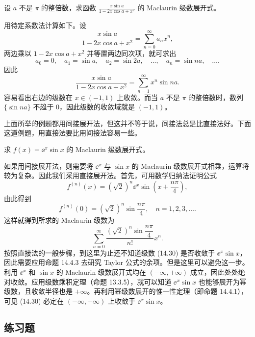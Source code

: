 \begin{xexample}[14.4.5]
设 $a$ 不是 $\pi$ 的整倍数，求函数 $\displaystyle\frac{x\sin a}{1-2x\cos a+x^2}$ 的 Maclaurin 级数展开式。
\end{xexample}
\begin{xsolution}
用待定系数法计算如下。设
\[
  \frac{x\sin a}{1-2x\cos a+x^2}=\sum_{n=0}^{\infty}a_nx^n,
\]
两边乘以 $1-2x\cos a+x^2$ 并等置两边同次项，就可求出
\[
  a_0=0,\quad a_1=\sin a,\quad a_2=\sin2a,\quad\ldots,\quad a_n=\sin na,\quad\ldots.
\]
因此
\[
  \frac{x\sin a}{1-2x\cos a+x^2}=\sum_{n=1}^{\infty}x^n\sin na.
\]
容易看出右边的级数在 $x\in(-1,1)$ 上收敛。而当 $a$ 不是 $\pi$ 的整倍数时，数列 $\{\sin na\}$ 不趋于 $0$，因此级数的收敛域就是 $(-1,1)$。
\end{xsolution}

上面所举的例题都用间接展开法，但这并不等于说，间接法总是比直接法好。下面这道例题，用直接法要比用间接法容易一些。

\begin{xexample}[14.4.6]
求 $f(x)=\ee^x\sin x$ 的 Maclaurin 级数展开式。
\end{xexample}
\begin{xsolution}
如果用间接展开法，则需要将 $\ee^x$ 与 $\sin x$ 的 Maclaurin 级数展开式相乘，运算将较为复杂。因此我们采用直接展开法。首先，可用数学归纳法证明公式
\[
  f^{(n)}(x)=(\sqrt2)^n\ee^x\sin\left(x+\frac{n\pi}{4}\right),
\]
由此得到
\[
  f^{(n)}(0)=(\sqrt2)^n\sin\frac{n\pi}{4},\quad n=1,2,3,\ldots.
\]
这样就得到所求的 Maclaurin 级数为
\begin{equation}
  \sum_{n=0}^{\infty}\frac{(\sqrt2)^n\sin\dfrac{n\pi}{4}}{n!}x^n.
  \tag{14.30}
  \label{eq:14.30}
\end{equation}
按照直接法的一般步骤，到这里为止还不知道级数 (14.30) 是否收敛于 $\ee^x\sin x$，因此需要应用命题 14.4.3 去研究 Taylor 公式的余项。但是这里可以避免这一步。利用 $\ee^x$ 和 $\sin x$ 的 Maclaurin 级数展开式均在 $(-\infty,+\infty)$ 成立，因此处处绝对收敛。应用级数乘积定理（命题 13.3.5），就可以知道 $\ee^x\sin x$ 也能够展开为幂级数，且收敛半径也是 $+\infty$。再利用幂级数展开的惟一性定理（即命题 14.4.1），可见 (14.30) 必定在 $(-\infty,+\infty)$ 上收敛于 $\ee^x\sin x$。
\end{xsolution}

\subsection{练习题}

